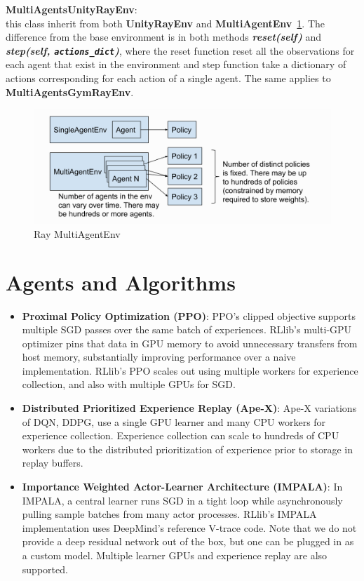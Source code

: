 \textbf{MultiAgentsUnityRayEnv}:\\
this class inherit from both \colorbox{gray!20}{\textbf{UnityRayEnv}} and \colorbox{gray!20}{\textbf{MultiAgentEnv}}~\ref{fig:ray_multiagentenv}. The difference from the base environment is in both methods \textit{\textbf{\colorbox{gray!20}{reset(self)}}} and \textit{\textbf{\colorbox{gray!20}{step(self, \texttt{actions\_dict})}}}, where the reset function reset all the observations for each agent that exist in the environment and step function take a dictionary of actions corresponding for each action of a single agent. The same applies to \textbf{MultiAgentsGymRayEnv}.

\begin{figure}[H]
	\centering
		\includegraphics[width=\linewidth]{figures/architecture/ray_multiagentenv.png}
		\caption{Ray MultiAgentEnv}
		\label{fig:ray_multiagentenv}
\end{figure}

\section{Agents and Algorithms}

\begin{itemize}
    \item \textbf{Proximal Policy Optimization (PPO)}: PPO’s clipped objective supports multiple SGD passes over the same batch of experiences. RLlib’s multi-GPU optimizer pins that data in GPU memory to avoid unnecessary transfers from host memory, substantially improving performance over a naive implementation. RLlib’s PPO scales out using multiple workers for experience collection, and also with multiple GPUs for SGD.

    \item \textbf{Distributed Prioritized Experience Replay (Ape-X)}: Ape-X variations of DQN, DDPG, use a single GPU learner and many CPU workers for experience collection. Experience collection can scale to hundreds of CPU workers due to the distributed prioritization of experience prior to storage in replay buffers.

    \item \textbf{Importance Weighted Actor-Learner Architecture (IMPALA)}: In IMPALA, a central learner runs SGD in a tight loop while asynchronously pulling sample batches from many actor processes. RLlib’s IMPALA implementation uses DeepMind’s reference V-trace code. Note that we do not provide a deep residual network out of the box, but one can be plugged in as a custom model. Multiple learner GPUs and experience replay are also supported.
\end{itemize}

